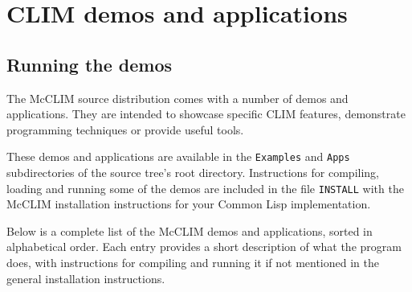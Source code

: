 \chapter{CLIM demos and applications}

\section{Running the demos}

The McCLIM source distribution comes with a number of demos and
applications.  They are intended to showcase specific CLIM features,
demonstrate programming techniques or provide useful tools.

These demos and applications are available in the \texttt{Examples}
and \texttt{Apps} subdirectories of the source tree's root directory.
Instructions for compiling, loading and running some of the demos are
included in the file \texttt{INSTALL} with the McCLIM installation
instructions for your Common Lisp implementation.

Below is a complete list of the McCLIM demos and applications, sorted in
alphabetical order.  Each entry provides a short description of what the
program does, with instructions for compiling and running it if not
mentioned in the general installation instructions.


